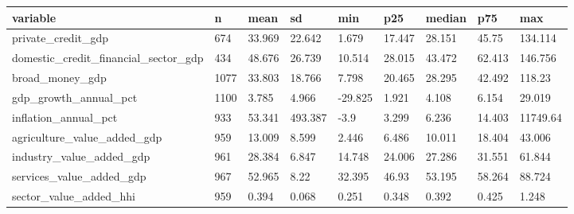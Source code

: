 ﻿%
\begin{tabular}{lllllllll}
\hline
variable & n & mean & sd & min & p25 & median & p75 & max \\
\hline
private\_credit\_gdp & 674 & 33.969 & 22.642 & 1.679 & 17.447 & 28.151 & 45.75 & 134.114 \\
domestic\_credit\_financial\_sector\_gdp & 434 & 48.676 & 26.739 & 10.514 & 28.015 & 43.472 & 62.413 & 146.756 \\
broad\_money\_gdp & 1077 & 33.803 & 18.766 & 7.798 & 20.465 & 28.295 & 42.492 & 118.23 \\
gdp\_growth\_annual\_pct & 1100 & 3.785 & 4.966 & -29.825 & 1.921 & 4.108 & 6.154 & 29.019 \\
inflation\_annual\_pct & 933 & 53.341 & 493.387 & -3.9 & 3.299 & 6.236 & 14.403 & 11749.64 \\
agriculture\_value\_added\_gdp & 959 & 13.009 & 8.599 & 2.446 & 6.486 & 10.011 & 18.404 & 43.006 \\
industry\_value\_added\_gdp & 961 & 28.384 & 6.847 & 14.748 & 24.006 & 27.286 & 31.551 & 61.844 \\
services\_value\_added\_gdp & 967 & 52.965 & 8.22 & 32.395 & 46.93 & 53.195 & 58.264 & 88.724 \\
sector\_value\_added\_hhi & 959 & 0.394 & 0.068 & 0.251 & 0.348 & 0.392 & 0.425 & 1.248 \\
\hline
\end{tabular}

